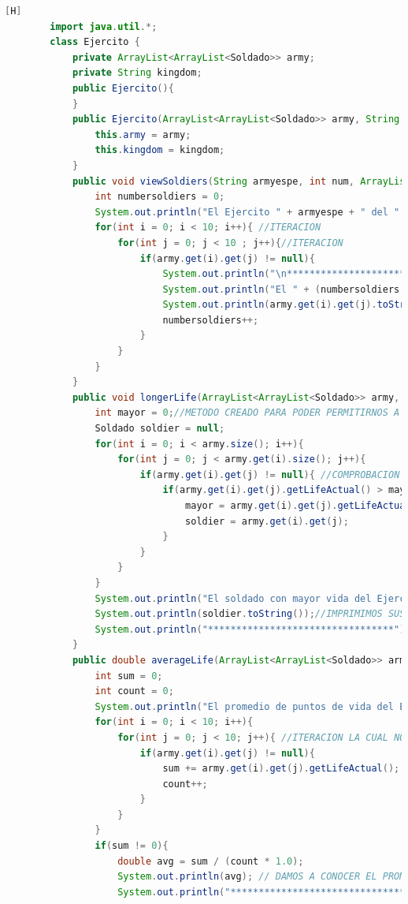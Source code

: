 \documentclass{article}
\begin{document}
	\begin{lstlisting}[language=java,caption={Las lineas de codigos de la clase Ejercito creada:}][H]
		import java.util.*;
		class Ejercito {   
			private ArrayList<ArrayList<Soldado>> army;
			private String kingdom;
			public Ejercito(){
			}
			public Ejercito(ArrayList<ArrayList<Soldado>> army, String kingdom){
				this.army = army;
				this.kingdom = kingdom;
			}
			public void viewSoldiers(String armyespe, int num, ArrayList<ArrayList<Soldado>> army){
				int numbersoldiers = 0;
				System.out.println("El Ejercito " + armyespe + " del " + num + " ejercito sus soldados son :");
				for(int i = 0; i < 10; i++){ //ITERACION
					for(int j = 0; j < 10 ; j++){//ITERACION
						if(army.get(i).get(j) != null){
							System.out.println("\n*********************************");
							System.out.println("El " + (numbersoldiers + 1) + " soldado es: ");
							System.out.println(army.get(i).get(j).toString());
							numbersoldiers++;
						}
					}
				}
			}
			public void longerLife(ArrayList<ArrayList<Soldado>> army, String kingdom){
				int mayor = 0;//METODO CREADO PARA PODER PERMITIRNOS A CONOCER EL SOLDADO CON MAYOR VIDA DE CADA EJERCITO 
				Soldado soldier = null;
				for(int i = 0; i < army.size(); i++){
					for(int j = 0; j < army.get(i).size(); j++){
						if(army.get(i).get(j) != null){ //COMPROBACION QUE HACEMOS PARA PODER DECIR QUE EL CASILLERO DONDE ESTAMOS ES UN SOLDADO QUE EXISTE
							if(army.get(i).get(j).getLifeActual() > mayor){ //COMPARAMOS PUNTOS DE VIDA DE CADA SOLDADO PARA VER QUIEN ES EL MAYOR 
								mayor = army.get(i).get(j).getLifeActual();
								soldier = army.get(i).get(j);
							}
						}
					}
				}
				System.out.println("El soldado con mayor vida del Ejercito " + kingdom + " es: ");
				System.out.println(soldier.toString());//IMPRIMIMOS SUS DATOS PARA PODER VER DE QUE SOLDADO SE TRATA 
				System.out.println("*********************************");
			}
			public double averageLife(ArrayList<ArrayList<Soldado>> army , String kingdom){
				int sum = 0;
				int count = 0;
				System.out.println("El promedio de puntos de vida del Ejercito " + kingdom + " es: ");
				for(int i = 0; i < 10; i++){
					for(int j = 0; j < 10; j++){ //ITERACION LA CUAL NOS AYUDA A PASAR POR TODOS LOS SOLDADOS DE CADA EJERCITO
						if(army.get(i).get(j) != null){ 
							sum += army.get(i).get(j).getLifeActual();
							count++;
						}
					}
				}
				if(sum != 0){
					double avg = sum / (count * 1.0);
					System.out.println(avg); // DAMOS A CONOCER EL PROMEDIO DE VIDA DE CADA EJERCITO 
					System.out.println("*********************************");

\end{lstlisting}
\end{document}
